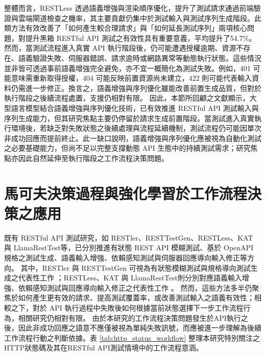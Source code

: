 \begin{ZhChapter}
\begin{enumerate}
\end{enumerate}
\text 整體而言，RESTLess 透過語義增強與渲染順序優化，提升了測試請求通過前端驗證與雲端閘道檢查之機率，其主要貢獻仍集中於測試輸入與測試序列生成階段。此類方法有效改善了「如何產生較合理請求」與「如何延長測試序列」兩項核心問題，對提升黑箱 RESTful API 測試之有效性具有重要意義，平均提升了54.7\%。
\text 然而，當測試流程進入真實 API 執行階段後，仍可能遭遇授權逾期、資源不存在、語義驗證失敗、伺服器錯誤、請求逾時或網路異常等動態執行狀態。這些情況並非皆可透過事前語義增強完全避免，亦不宜一概簡化為測試失敗。例如，401 可能意味需重新取得授權，404 可能反映前置資源尚未建立，422 則可能代表輸入資料仍需進一步修正。換言之，語義增強與序列優化雖能改善前置生成品質，但對於執行階段之後續流程處置，支援仍相對有限。
\text 因此，本節所回顧之文獻顯示，大型語言模型結合語義增強與序列優化技術，已有效推進 RESTful API 測試輸入與序列生成能力，但其研究焦點主要仍停留於請求生成前置階段。當測試進入真實執行環境後，若缺乏對失敗狀態之後續處理與流程延續機制，測試流程仍可能因單次非成功回應而提前終止。此一缺口說明，語義增強與序列優化應被視為自動化測試之必要基礎能力，但尚不足以完整支撐動態 API 生態中的持續測試需求；研究焦點亦因此自然延伸至執行階段之工作流程決策問題。

\section{馬可夫決策過程與強化學習於工作流程決策之應用}
\text 既有 RESTful API 測試研究，如 RESTler、RESTTestGen、RESTLess、KAT 與 LlamaRestTest等，已分別推進有狀態 REST API 模糊測試、基於 OpenAPI 規格之測試生成、語義輸入增強、依賴感知測試與伺服器回應導向輸入修正等方向。
\text 其中，RESTler 與 RESTTestGen 可視為有狀態模糊測試與規格導向測試生成之代表性工作 \parencite{Atlidakis2019RESTler,Corradini2022RestTestGen,Viglianisi2020RESTTESTGEN}；RESTLess、KAT 與 LlamaRestTest則分別對應語義輸入增強、依賴感知測試與回應導向輸入修正之代表性工作 \parencite{Zheng2024RESTLess,Nguyen2024KAT,Kim2025LlamaRestTest}。
\text 然而，這些方法多半仍聚焦於如何產生更有效的請求、提高測試覆蓋率，或改善測試輸入之語義有效性；相較之下，對於 API 執行過程中失敗後如何根據當前狀態選擇下一步工作流程行為，相關研究仍相對有限。
\text 由於本研究的工作流程決策問題發生於API執行之後，因此非成功回應之語意不應僅被視為單純失敗訊號，而應被進一步理解為後續工作流程行動之判斷依據。表 \ref{tab:http_status_workflow} 整理本研究特別關注之HTTP狀態碼及其在RESTful API測試情境中的工作流程意涵。


\end{ZhChapter}
